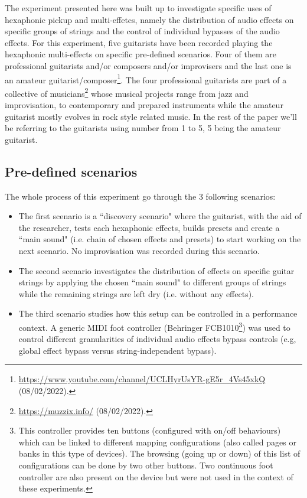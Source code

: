 \documentclass{article}
\begin{document}
The experiment presented here was built up to investigate specific uses of hexaphonic pickup and multi-effetcs, namely the distribution of audio effects on specific groups of strings and the control of individual bypasses of the audio effects. 
For this experiment, five guitarists have been recorded playing the hexaphonic multi-effects on specific pre-defined scenarios. Four of them are professional guitarists and/or composers and/or improvisers and the last one is an amateur guitarist/composer\footnote{\url{https://www.youtube.com/channel/UCLHyrUsYR-gE5r\_4Vs45xkQ} (08/02/2022).}. The four professional guitarists are part of a collective of musicians\footnote{\url{https://muzzix.info/} (08/02/2022).} whose musical projects range from jazz and improvisation, to contemporary and prepared instruments while the amateur guitarist mostly evolves in rock style related music. In the rest of the paper we'll be referring to the guitarists using number from 1 to 5, 5 being the amateur guitarist. 


\subsection{Pre-defined scenarios}
The whole process of this experiment go through the 3 following scenarios:
\begin{itemize}
    \item The first scenario is a ``discovery scenario" where the guitarist, with the aid of the researcher, tests each hexaphonic effects, builds presets and create a ``main sound" (i.e. chain of chosen effects and presets) to start working on the next scenario. No improvisation was recorded during this scenario.  
    
    \item The second scenario investigates the distribution of effects on specific guitar strings by applying the chosen ``main sound" to different groups of strings while the remaining strings are left dry (i.e. without any effects).
    
    \item The third scenario studies how this setup can be controlled in a performance context. A generic MIDI foot controller (Behringer FCB1010\footnote{\label{foot:Behringer1010}This controller provides ten buttons (configured with on/off behaviours) which can be linked to different mapping configurations (also called pages or banks in this type of devices). The browsing (going up or down) of this list of configurations can be done by two other buttons. Two continuous foot controller are also present on the device but were not used in the context of these experiments.}) was used to control different granularities of individual audio effects bypass controls (e.g, global effect bypass versus string-independent bypass). 
\end{itemize} 
\end{document}
